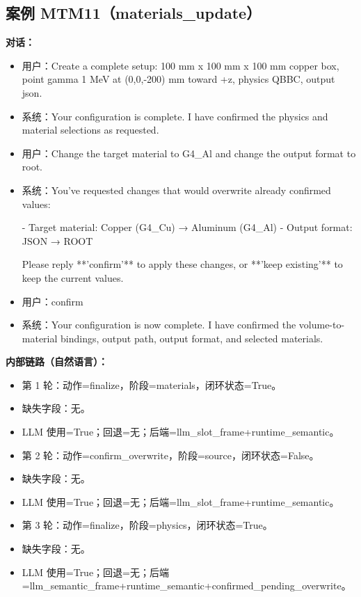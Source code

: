 \documentclass[11pt]{ctexart}
\begin{document}
\subsection{案例 MTM11（materials\_update）}
\textbf{对话：}
\begin{itemize}
\item 用户：Create a complete setup: 100 mm x 100 mm x 100 mm copper box, point gamma 1 MeV at (0,0,-200) mm toward +z, physics QBBC, output json.
\item 系统：Your configuration is complete. I have confirmed the physics and material selections as requested.
\item 用户：Change the target material to G4\_Al and change the output format to root.
\item 系统：You've requested changes that would overwrite already confirmed values:

- Target material: Copper (G4\_Cu) → Aluminum (G4\_Al)
- Output format: JSON → ROOT

Please reply **'confirm'** to apply these changes, or **'keep existing'** to keep the current values.
\item 用户：confirm
\item 系统：Your configuration is now complete. I have confirmed the volume-to-material bindings, output path, output format, and selected materials.
\end{itemize}
\textbf{内部链路（自然语言）：}
\begin{itemize}
\item 第 1 轮：动作=finalize，阶段=materials，闭环状态=True。
\item 缺失字段：无。
\item LLM 使用=True；回退=无；后端=llm\_slot\_frame+runtime\_semantic。
\item 第 2 轮：动作=confirm\_overwrite，阶段=source，闭环状态=False。
\item 缺失字段：无。
\item LLM 使用=True；回退=无；后端=llm\_slot\_frame+runtime\_semantic。
\item 第 3 轮：动作=finalize，阶段=physics，闭环状态=True。
\item 缺失字段：无。
\item LLM 使用=True；回退=无；后端=llm\_semantic\_frame+runtime\_semantic+confirmed\_pending\_overwrite。
\end{itemize}
\end{document}
